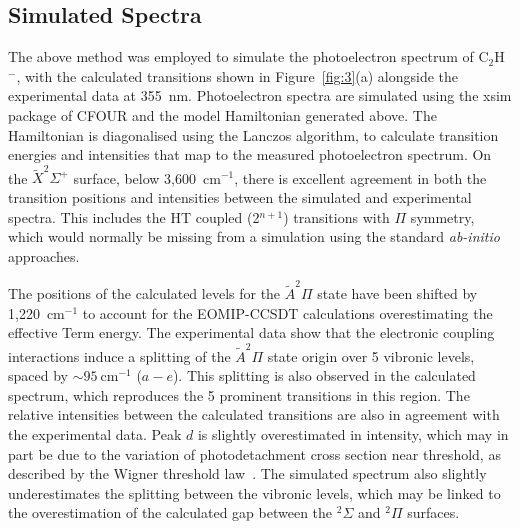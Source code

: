 \documentclass[aip,graphicx]{revtex4-1}
\begin{document}
\subsection{Simulated Spectra}
The above method was employed to simulate the photoelectron spectrum of C$_2$H$^-$, with the calculated transitions shown in Figure~\ref{fig:3}(a) alongside the experimental data at 355~nm. Photoelectron spectra are simulated using the xsim package of CFOUR and the model Hamiltonian generated above. The Hamiltonian is diagonalised using the Lanczos algorithm, to calculate transition energies and intensities that map to the measured photoelectron spectrum.  
On the $\tilde{X} ^2\Sigma^+$ surface, below 3,600~cm$^{-1}$, there is excellent agreement in both the transition positions and intensities between the simulated and experimental spectra. This includes the HT coupled (2$^{n+1}$) transitions with $\Pi$ symmetry, which would normally be missing from a simulation using the standard \emph{ab-initio} approaches. 

The positions of the calculated levels for the $\tilde{A}^2\Pi$ state have been shifted by 1,220~cm$^{-1}$ to account for the EOMIP-CCSDT calculations overestimating the effective Term energy. The experimental data show that the electronic coupling interactions induce a splitting of the $\tilde{A} ^2\Pi$ state origin over 5 vibronic levels, spaced by $\sim 95~$cm$^{-1}$ ($a-e$). This splitting is also observed in the calculated spectrum, which reproduces the 5 prominent transitions in this region. The relative intensities between the calculated transitions are also in agreement with the experimental data. Peak $d$ is slightly overestimated in intensity, which may in part be due to the variation of photodetachment cross section near threshold, as described by the Wigner threshold law~\cite{wig48}. The simulated spectrum also slightly underestimates the splitting between the vibronic levels, which may be linked to the overestimation of the calculated gap between the $^2\Sigma$ and $^2\Pi$ surfaces.
\end{document}
